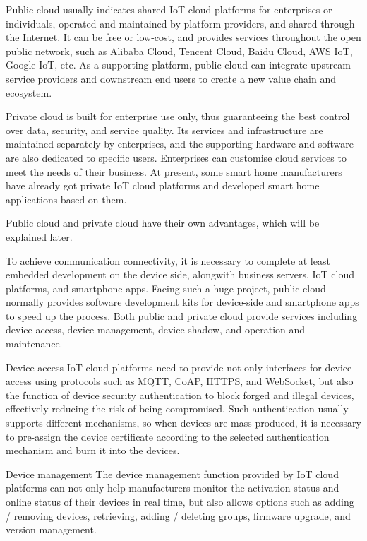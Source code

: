 \documentclass[a4paper,12pt]{book}
\begin{document}
Public cloud usually indicates shared IoT cloud platforms for enterprises or individuals, operated and maintained by platform providers, and shared through the Internet. It can be free or low-cost, and provides services throughout the open public network, such as Alibaba Cloud, Tencent Cloud, Baidu Cloud, AWS IoT, Google IoT, etc. As a supporting platform, public cloud can integrate upstream service providers and downstream end users to create a new value chain and ecosystem.

Private cloud is built for enterprise use only, thus guaranteeing the best control over data, security, and service quality. Its services and infrastructure are maintained separately by enterprises, and the supporting hardware and software are also dedicated to specific users. Enterprises can customise cloud services to meet the needs of their business. At present, some smart home manufacturers have already got private IoT cloud platforms and developed smart home applications based on them.

Public cloud and private cloud have their own advantages, which will be explained later.

To achieve communication connectivity, it is necessary to complete at least embedded development on the device side, alongwith business servers, IoT cloud platforms, and smartphone apps. Facing such a huge project, public cloud normally provides software development kits for device-side and smartphone apps to speed up the process. Both public and private cloud provide services including device access, device management, device shadow, and operation and maintenance.

\begin{term}{Device access}
    IoT cloud platforms need to provide not only interfaces for device access using protocols such as MQTT, CoAP, HTTPS, and WebSocket, but also the function of device security authentication to block forged and illegal devices, effectively reducing the risk of being compromised. Such authentication usually supports different mechanisms, so when devices are mass-produced, it is necessary to pre-assign the device certificate according to the selected authentication mechanism and burn it into the devices.
\end{term}

\begin{term}{Device management}
    The device management function provided by IoT cloud platforms can not only help manufacturers monitor the activation status and online status of their devices in real time, but also allows options such as adding / removing devices, retrieving, adding / deleting groups, firmware upgrade, and version management.
\end{term}
\end{document}
